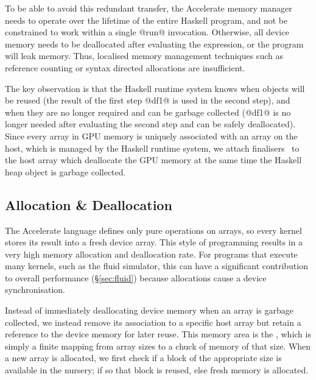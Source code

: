 To be able to avoid this redundant transfer, the Accelerate memory manager needs
to operate over the lifetime of the entire Haskell program, and not be
constrained to work within a single @run@ invocation. Otherwise, all device
memory needs to be deallocated after evaluating the expression, or the program
will leak memory. Thus, localised memory management techniques such as reference
counting or syntax directed allocations are insufficient.

The key observation is that the Haskell runtime system knows when objects will
be reused (the result of the first step @df1@ is used in the second step),
and when they are no longer required and can be garbage collected (@df1@ is
no longer needed after evaluating the second step and can be safely
deallocated). Since every array in GPU memory is uniquely associated with an
array on the host, which is managed by the Haskell runtime system, we attach
finalisers~\cite{PeytonJones:2000ks} to the host array which deallocate the
GPU memory at the same time the Haskell heap object is garbage collected.

% 


\subsection{Allocation \& Deallocation}

The Accelerate language defines only pure operations on arrays, so every kernel
stores its result into a fresh device array. This style of programming results
in a very high memory allocation and deallocation rate. For programs that
execute many kernels, such as the fluid simulator, this can have a
significant contribution to overall performance (\S\ref{sec:fluid}) because
allocations cause a device synchronisation.

Instead of immediately deallocating device memory when an array is garbage
collected, we instead remove its association to a specific host array but retain
a reference to the device memory for later reuse. This memory area is the
, which is simply a finite mapping from array sizes to a chuck
of memory of that size. When a new array is allocated, we first check if a block
of the appropriate size is available in the nursery; if so that block is reused,
else fresh memory is allocated.

